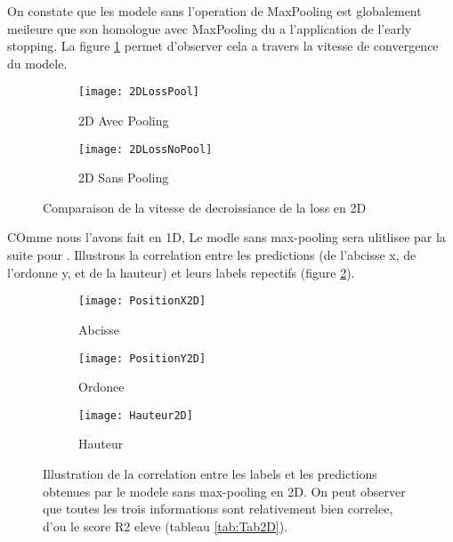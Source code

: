     On constate que les modele sans l'operation de MaxPooling est globalement meileure que son homologue avec MaxPooling du a l'application de l'early stopping. La figure \ref{fig:2DLoss} permet d'observer cela a travers la vitesse de convergence du modele.
    
    \begin{figure}[!h]
    \begin{subfigure}{.5\textwidth}
    \centering
    \texttt{[image: 2DLossPool]}  
    \caption[2DPool]{2D Avec Pooling}
    \end{subfigure}
    \begin{subfigure}{.5\textwidth}
    \centering
    \texttt{[image: 2DLossNoPool]}  
    \caption[2DNoPool]{2D Sans Pooling}
    \end{subfigure}

    \centering
    \decoRule
    \caption[Loss en 2D]{Comparaison de la vitesse de decroissiance de la loss en 2D}
    \label{fig:2DLoss}
    \end{figure}

    COmme nous l'avons fait en 1D, Le modle sans max-pooling sera ulitlisee par la suite pour . Illustrons la correlation entre les predictions (de l'abcisse x, de l'ordonne y, et de la hauteur) et leurs labels repectifs (figure \ref{fig:Illustration2D}).
    \begin{figure}[!h]
    \begin{subfigure}{.33\textwidth}
    \centering
    \texttt{[image: PositionX2D]}  
    \caption[PosX2D]{Abcisse}
    \end{subfigure}
    \begin{subfigure}{.33\textwidth}
    \centering
    \texttt{[image: PositionY2D]}  
    \caption[PosY2D]{Ordonee}
    \end{subfigure}
    \begin{subfigure}{.33\textwidth}
    \centering
    \texttt{[image: Hauteur2D]}  
    \caption[H2D]{Hauteur}
    \end{subfigure}
    
     \centering
    \decoRule
    \caption[Illustration 2D]{Illustration de la correlation entre les labels et les predictions obtenues par le modele sans max-pooling en 2D. On peut observer que toutes les trois informations sont relativement bien correlee, d'ou le score R2 eleve (tableau \ref{tab:Tab2D}).}
    \label{fig:Illustration2D}
    \end{figure}
    
